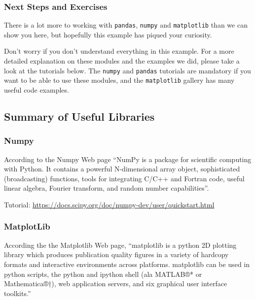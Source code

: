 \subsubsection{Next Steps and Exercises}\label{next-steps-and-exercises}

There is a lot more to working with \texttt{pandas}, \texttt{numpy} and
\texttt{matplotlib} than we can show you here, but hopefully this
example has piqued your curiosity.

Don't worry if you don't understand everything in this example. For a
more detailed explanation on these modules and the examples we did,
please take a look at the tutorials below. The \texttt{numpy} and
\texttt{pandas} tutorials are mandatory if you want to be able to use
these modules, and the \texttt{matplotlib} gallery has many useful code
examples.

\subsection{Summary of Useful
Libraries}\label{summary-of-useful-libraries}

\subsubsection{Numpy}\label{s:numpy}



According to the Numpy Web page ``NumPy is a package for scientific
computing with Python. It contains a powerful N-dimensional array
object, sophisticated (broadcasting) functions, tools for integrating
C/C++ and Fortran code, useful linear algebra, Fourier transform, and
random number capabilities''.

Tutorial:
\url{https://docs.scipy.org/doc/numpy-dev/user/quickstart.html}

\subsubsection{MatplotLib}\label{matplotlib}


According the the Matplotlib Web page, ``matplotlib is a python 2D
plotting library which produces publication quality figures in a variety
of hardcopy formats and interactive environments across platforms.
matplotlib can be used in python scripts, the python and ipython shell
(ala MATLAB®* or Mathematica®†), web application servers, and six
graphical user interface toolkits.''


